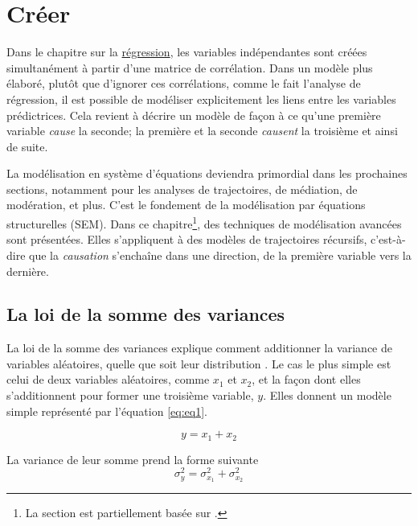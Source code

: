 \documentclass[
]{book}
\begin{document}
\hypertarget{cruxe9er}{%
\chapter{Créer}\label{cruxe9er}}

Dans le chapitre sur la \protect\hyperlink{ruxe9gression}{régression}, les variables indépendantes sont créées simultanément à partir d'une matrice de corrélation. Dans un modèle plus élaboré, plutôt que d'ignorer ces corrélations, comme le fait l'analyse de régression, il est possible de modéliser explicitement les liens entre les variables prédictrices.
Cela revient à décrire un modèle de façon à ce qu'une première variable \emph{cause} la seconde; la première et la seconde \emph{causent} la troisième et ainsi de suite.

La modélisation en système d'équations deviendra primordial dans les prochaines sections, notamment pour les analyses de trajectoires, de médiation, de modération, et plus. C'est le fondement de la modélisation par équations structurelles (SEM).
Dans ce chapitre\footnote{La section est partiellement basée sur \textcite{Caron21}.}, des techniques de modélisation avancées sont présentées. Elles s'appliquent à des modèles de trajectoires récursifs, c'est-à-dire que la \emph{causation} s'enchaîne dans une direction, de la première variable vers la dernière.

\hypertarget{la-loi-de-la-somme-des-variances}{%
\section{La loi de la somme des variances}\label{la-loi-de-la-somme-des-variances}}

La loi de la somme des variances explique comment additionner la variance de variables aléatoires, quelle que soit leur distribution \autocite{casella2002}. Le cas le plus simple est celui de deux variables aléatoires, comme \(x_1\) et \(x_2\), et la façon dont elles s'additionnent pour former une troisième variable, \(y\). Elles donnent un modèle simple représenté par l'équation \eqref{eq:eq1}.

\begin{equation}
y=x_1+x_2
\label{eq:eq1}
\end{equation}

La variance de leur somme prend la forme suivante
\begin{equation}
\sigma_y^2=\sigma_{x_1}^2+\sigma_{x_2}^2
\label{eq:eq2}
\end{equation}
\end{document}
